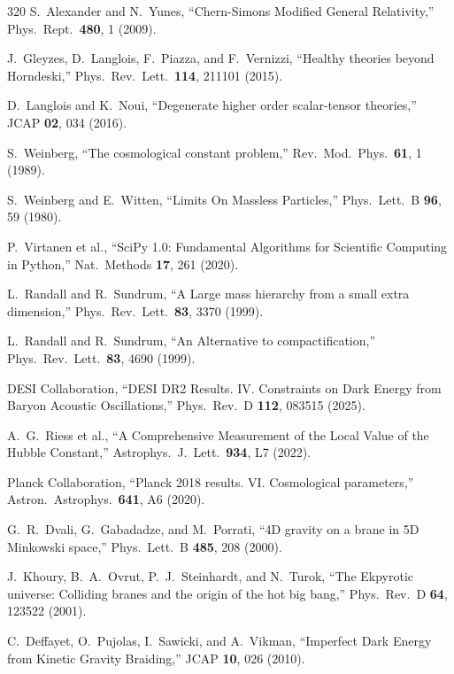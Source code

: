 \begin{thebibliography}{320}
S.~Alexander and N.~Yunes,
``Chern-Simons Modified General Relativity,''
Phys.\ Rept.\ \textbf{480}, 1 (2009).

J.~Gleyzes, D.~Langlois, F.~Piazza, and F.~Vernizzi,
``Healthy theories beyond Horndeski,''
Phys.\ Rev.\ Lett.\ \textbf{114}, 211101 (2015).

D.~Langlois and K.~Noui,
``Degenerate higher order scalar-tensor theories,''
JCAP \textbf{02}, 034 (2016).

S.~Weinberg,
``The cosmological constant problem,''
Rev.\ Mod.\ Phys.\ \textbf{61}, 1 (1989).

S.~Weinberg and E.~Witten,
``Limits On Massless Particles,''
Phys.\ Lett.\ B \textbf{96}, 59 (1980).

P.~Virtanen et al.,
``SciPy 1.0: Fundamental Algorithms for Scientific Computing in Python,''
Nat.\ Methods \textbf{17}, 261 (2020).

L.~Randall and R.~Sundrum,
``A Large mass hierarchy from a small extra dimension,''
Phys.\ Rev.\ Lett.\ \textbf{83}, 3370 (1999).

L.~Randall and R.~Sundrum,
``An Alternative to compactification,''
Phys.\ Rev.\ Lett.\ \textbf{83}, 4690 (1999).

DESI Collaboration,
``DESI DR2 Results. IV. Constraints on Dark Energy from Baryon Acoustic Oscillations,''
Phys.\ Rev.\ D \textbf{112}, 083515 (2025).

A.~G.~Riess et al.,
``A Comprehensive Measurement of the Local Value of the Hubble Constant,''
Astrophys.\ J.\ Lett.\ \textbf{934}, L7 (2022).

Planck Collaboration,
``Planck 2018 results. VI. Cosmological parameters,''
Astron.\ Astrophys.\ \textbf{641}, A6 (2020).

G.~R.~Dvali, G.~Gabadadze, and M.~Porrati,
``4D gravity on a brane in 5D Minkowski space,''
Phys.\ Lett.\ B \textbf{485}, 208 (2000).

J.~Khoury, B.~A.~Ovrut, P.~J.~Steinhardt, and N.~Turok,
``The Ekpyrotic universe: Colliding branes and the origin of the hot big bang,''
Phys.\ Rev.\ D \textbf{64}, 123522 (2001).

C.~Deffayet, O.~Pujolas, I.~Sawicki, and A.~Vikman,
``Imperfect Dark Energy from Kinetic Gravity Braiding,''
JCAP \textbf{10}, 026 (2010).


\end{thebibliography}

